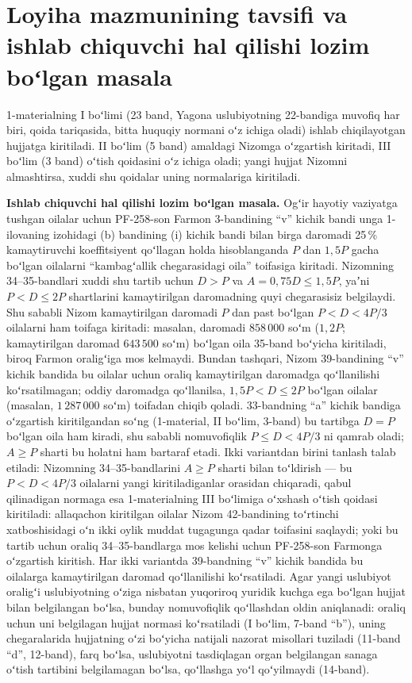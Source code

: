 \documentclass[14pt,a4paper]{extarticle}
\begin{document}
\section{Loyiha mazmunining tavsifi va ishlab chiquvchi hal qilishi lozim boʻlgan masala}\label{sec:q}
1-materialning I boʻlimi (23 band, Yagona uslubiyotning 22-bandiga muvofiq har biri, qoida tariqasida, bitta huquqiy normani oʻz ichiga oladi) ishlab chiqilayotgan hujjatga kiritiladi. II boʻlim (5 band) amaldagi Nizomga oʻzgartish kiritadi, III boʻlim (3 band) oʻtish qoidasini oʻz ichiga oladi; yangi hujjat Nizomni almashtirsa, xuddi shu qoidalar uning normalariga kiritiladi.

\textbf{Ishlab chiquvchi hal qilishi lozim boʻlgan masala.} Ogʻir hayotiy vaziyatga tushgan oilalar uchun PF-258-son Farmon 3-bandining “v” kichik bandi unga 1-ilovaning izohidagi (b) bandining (i) kichik bandi bilan birga daromadi 25\,\% kamaytiruvchi koeffitsiyent qoʻllagan holda hisoblanganda $P$ dan $1{,}5P$ gacha boʻlgan oilalarni “kambagʻallik chegarasidagi oila” toifasiga kiritadi\cite{pf258}. Nizomning 34–35-bandlari xuddi shu tartib uchun $D>P$ va $A=0{,}75D\le1{,}5P$, yaʼni $P<D\le2P$ shartlarini kamaytirilgan daromadning quyi chegarasisiz belgilaydi. Shu sababli Nizom kamaytirilgan daromadi $P$ dan past boʻlgan $P<D<4P/3$ oilalarni ham toifaga kiritadi: masalan, daromadi $858\,000$ soʻm ($1{,}2P$; kamaytirilgan daromad $643\,500$ soʻm) boʻlgan oila 35-band boʻyicha kiritiladi, biroq Farmon oraligʻiga mos kelmaydi. Bundan tashqari, Nizom 39-bandining “v” kichik bandida bu oilalar uchun oraliq kamaytirilgan daromadga qoʻllanilishi koʻrsatilmagan; oddiy daromadga qoʻllanilsa, $1{,}5P<D\le2P$ boʻlgan oilalar (masalan, $1\,287\,000$ soʻm) toifadan chiqib qoladi. 33-bandning “a” kichik bandiga oʻzgartish kiritilgandan soʻng (1-material, II boʻlim, 3-band) bu tartibga $D=P$ boʻlgan oila ham kiradi, shu sababli nomuvofiqlik $P\le D<4P/3$ ni qamrab oladi; $A\ge P$ sharti bu holatni ham bartaraf etadi. Ikki variantdan birini tanlash talab etiladi: Nizomning 34–35-bandlarini $A\ge P$ sharti bilan toʻldirish — bu $P<D<4P/3$ oilalarni yangi kiritiladiganlar orasidan chiqaradi, qabul qilinadigan normaga esa 1-materialning III boʻlimiga oʻxshash oʻtish qoidasi kiritiladi: allaqachon kiritilgan oilalar Nizom 42-bandining toʻrtinchi xatboshisidagi oʻn ikki oylik muddat tugagunga qadar toifasini saqlaydi; yoki bu tartib uchun oraliq 34–35-bandlarga mos kelishi uchun PF-258-son Farmonga oʻzgartish kiritish. Har ikki variantda 39-bandning “v” kichik bandida bu oilalarga kamaytirilgan daromad qoʻllanilishi koʻrsatiladi. Agar yangi uslubiyot oraligʻi uslubiyotning oʻziga nisbatan yuqoriroq yuridik kuchga ega boʻlgan hujjat bilan belgilangan boʻlsa, bunday nomuvofiqlik qoʻllashdan oldin aniqlanadi: oraliq uchun uni belgilagan hujjat normasi koʻrsatiladi (I boʻlim, 7-band “b”), uning chegaralarida hujjatning oʻzi boʻyicha natijali nazorat misollari tuziladi (11-band “d”, 12-band), farq boʻlsa, uslubiyotni tasdiqlagan organ belgilangan sanaga oʻtish tartibini belgilamagan boʻlsa, qoʻllashga yoʻl qoʻyilmaydi (14-band).
\end{document}
